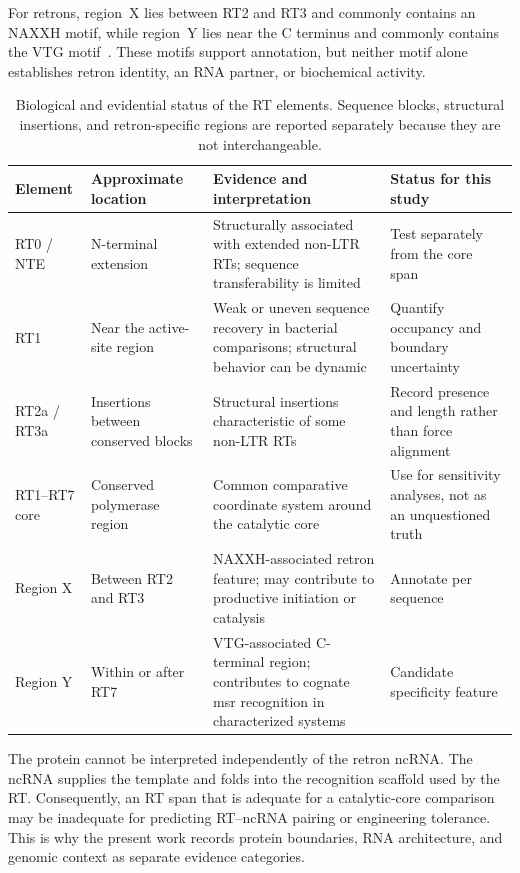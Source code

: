 For retrons, region~X lies between RT2 and RT3 and commonly contains an NAXXH
motif, while region~Y lies near the C terminus and commonly contains the VTG
motif~\cite{toro2014,mestre2020}. These motifs support annotation, but neither
motif alone establishes retron identity, an RNA partner, or biochemical
activity.

\begin{table}[ht]
\centering
\scriptsize
\setlength{\tabcolsep}{3.5pt}
\begin{tabularx}{\textwidth}{@{}p{1.65cm}p{2.55cm}X p{2.85cm}@{}}
\toprule
\textbf{Element} & \textbf{Approximate location} & \textbf{Evidence and interpretation} & \textbf{Status for this study}\\
\midrule
RT0 / NTE & N-terminal extension & Structurally associated with extended non-LTR RTs; sequence transferability is limited~\cite{blocker2005,simon2008} & Test separately from the core span\\
RT1 & Near the active-site region & Weak or uneven sequence recovery in bacterial comparisons; structural behavior can be dynamic & Quantify occupancy and boundary uncertainty\\
RT2a / RT3a & Insertions between conserved blocks & Structural insertions characteristic of some non-LTR RTs & Record presence and length rather than force alignment\\
RT1--RT7 core & Conserved polymerase region & Common comparative coordinate system around the catalytic core & Use for sensitivity analyses, not as an unquestioned truth\\
Region X & Between RT2 and RT3 & NAXXH-associated retron feature; may contribute to productive initiation or catalysis~\cite{mestre2020} & Annotate per sequence\\
Region Y & Within or after RT7 & VTG-associated C-terminal region; contributes to cognate msr recognition in characterized systems~\cite{inouye1999} & Candidate specificity feature\\
\bottomrule
\end{tabularx}
\caption[Biological meaning of RT elements]{Biological and evidential status of the RT elements. Sequence blocks, structural insertions, and retron-specific regions are reported separately because they are not interchangeable.}
\label{tab:rt-elements-revised}
\end{table}

The protein cannot be interpreted independently of the retron ncRNA. The
ncRNA supplies the template and folds into the recognition scaffold used by
the RT. Consequently, an RT span that is adequate for a catalytic-core
comparison may be inadequate for predicting RT--ncRNA pairing or engineering
tolerance. This is why the present work records protein boundaries, RNA
architecture, and genomic context as separate evidence categories.

